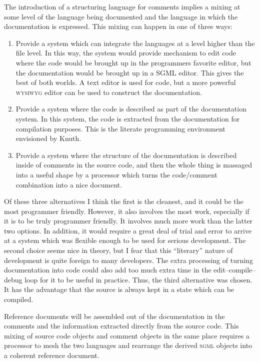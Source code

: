 The introduction of a structuring language for comments implies a mixing
at some level of the language being documented and the language in which 
the documentation is expressed. This mixing can happen in one of three
ways:
\begin{enumerate}
\item
Provide a system which can integrate the languages at a level higher than
the file level. In this way, the system would provide mechanism to edit
code where the code would be brought up in the programmers favorite
editor, but the documentation would be brought up in a SGML editor. This
gives the best of both worlds. A text editor is used for code, but a more
powerful \textsc{wysiwyg} editor can be used to construct the documentation.
\item
Provide a system where the code is described as part of the documentation
system. In this system, the code is extracted from the documentation for
compilation purposes. This is the literate programming environment 
envisioned by Knuth.
\item
Provide a system where the structure of the documentation is described
inside of comments in the source code, and then the whole thing is
massaged into a useful shape by a processor which turns the code/comment
combination into a nice document.
\end{enumerate}
\noindent
Of these three alternatives I think the first is the cleanest, and it 
could be the most programmer friendly. However, it also involves the 
most work, especially if it is to be truly programmer friendly. It involves
much more work than the latter two options. In addition, it would require
a great deal of trial and error to arrive at a system which was flexible
enough to be used for serious development. The second choice seems nice
in theory, but I fear that this ``literary'' nature of development is
quite foreign to many developers. The extra processing of turning 
documentation into code could also add too much extra time in the 
edit--compile--debug loop for it to be useful in practice. Thus, the
third alternative was chosen. It has the advantage that the source is
always kept in a state which can be compiled.

Reference documents will be assembled out of the
documentation in the comments and the information extracted directly
from the source code. This mixing of source code objects and comment
objects in the same place requires a processor to mesh the two 
languages and rearrange the derived \textsc{sgml} objects into a coherent
reference document. 


